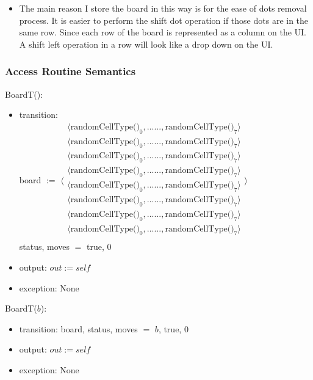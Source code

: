 \documentclass[12pt]{article}
\begin{document}
\begin{itemize}
  \item The main reason I store the board in this way is for the ease of dots removal process. It is easier to perform
        the shift dot operation if those dots are in the same row. Since each row of the board is represented as a
        column on the UI. A shift left operation in a row will look like a drop down on the UI.
\end{itemize}

\subsubsection* {Access Routine Semantics}

BoardT():
\begin{itemize}
\item transition: \\
      board $:=$ 
      $\langle \begin{array}{c}
      \langle \mbox{randomCellType()}_0, ... ... ,\mbox{randomCellType()}_7 \rangle\\
      \langle \mbox{randomCellType()}_0, ... ... ,\mbox{randomCellType()}_7 \rangle\\
      \langle \mbox{randomCellType()}_0, ... ... ,\mbox{randomCellType()}_7 \rangle\\
      \langle \mbox{randomCellType()}_0, ... ... ,\mbox{randomCellType()}_7 \rangle\\
      \langle \mbox{randomCellType()}_0, ... ... ,\mbox{randomCellType()}_7 \rangle\\
      \langle \mbox{randomCellType()}_0, ... ... ,\mbox{randomCellType()}_7 \rangle\\
      \langle \mbox{randomCellType()}_0, ... ... ,\mbox{randomCellType()}_7 \rangle\\
      \langle \mbox{randomCellType()}_0, ... ... ,\mbox{randomCellType()}_7 \rangle\\
      \end{array} \rangle$ \\ 
      status, moves $=$ true, 0
\item output: $out := \mathit{self}$
\item exception: None
\end{itemize}

\noindent BoardT($b$):
\begin{itemize}
\item transition: board, status, moves $=$ $b$, true, 0
\item output: $out := \mathit{self}$
\item exception: None
\end{itemize}
\end{document}
